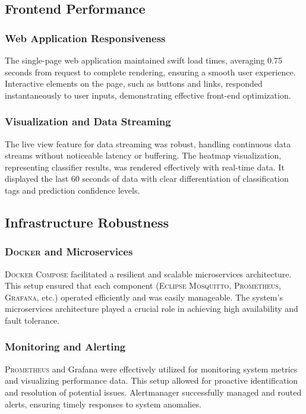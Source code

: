 \subsection{Frontend Performance}

\subsubsection{Web Application Responsiveness}

The single-page web application maintained swift load times, averaging 0.75 seconds from request to complete rendering, ensuring a smooth user experience. Interactive elements on the page, such as buttons and links, responded instantaneously to user inputs, demonstrating effective front-end optimization.

\subsubsection{Visualization and Data Streaming}

The live view feature for data streaming was robust, handling continuous data streams without noticeable latency or buffering. The heatmap visualization, representing classifier results, was rendered effectively with real-time data. It displayed the last 60 seconds of data with clear differentiation of classification tags and prediction confidence levels.
\subsection{Infrastructure Robustness}

\subsubsection{\textsc{Docker} and Microservices}

\textsc{Docker Compose} facilitated a resilient and scalable microservices architecture. This setup ensured that each component (\textsc{Eclipse Mosquitto}, \textsc{Prometheus}, \textsc{Grafana}, etc.) operated efficiently and was easily manageable. The system's microservices architecture played a crucial role in achieving high availability and fault tolerance.

\subsubsection{Monitoring and Alerting}

\textsc{Prometheus} and Grafana were effectively utilized for monitoring system metrics and visualizing performance data. This setup allowed for proactive identification and resolution of potential issues. Alertmanager successfully managed and routed alerts, ensuring timely responses to system anomalies.

